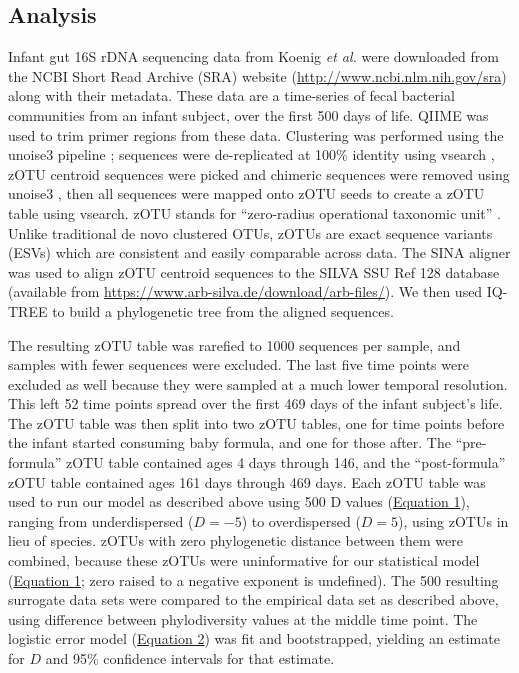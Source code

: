 \documentclass{article}
\begin{document}
\subsection{Analysis} \label{sec:analysis}
Infant gut 16S rDNA sequencing data from Koenig \emph{et al.} \cite{Koenig2011} were downloaded from the NCBI Short Read Archive (SRA) website (\url{http://www.ncbi.nlm.nih.gov/sra}) along with their metadata. These data are a time-series of fecal bacterial communities from an infant subject, over the first 500 days of life. QIIME \cite{Caporaso2010} was used to trim primer regions from these data. Clustering was performed using the unoise3 pipeline \cite{Edgar2016}; sequences were de-replicated at 100\% identity using vsearch \cite{Rognes2016}, zOTU centroid sequences were picked and chimeric sequences were removed using unoise3 \cite{Edgar2016}, then all sequences were mapped onto zOTU seeds to create a zOTU table using vsearch. zOTU stands for “zero-radius operational taxonomic unit” \cite{Edgar2016}. Unlike traditional de novo clustered OTUs, zOTUs are exact sequence variants (ESVs) which are consistent and easily comparable across data. The SINA aligner \cite{Pruesse2012} was used to align zOTU centroid sequences to the SILVA SSU Ref 128 database (available from \url{https://www.arb-silva.de/download/arb-files/}). We then used IQ-TREE \cite{Nguyen2015} to build a phylogenetic tree from the aligned sequences.
\par
The resulting zOTU table was rarefied to 1000 sequences per sample, and samples with fewer sequences were excluded. The last five time points were excluded as well because they were sampled at a much lower temporal resolution. This left 52 time points spread over the first 469 days of the infant subject's life. The zOTU table was then split into two zOTU tables, one for time points before the infant started consuming baby formula, and one for those after. The “pre-formula” zOTU table contained ages 4 days through 146, and the “post-formula” zOTU table contained ages 161 days through 469 days. Each zOTU table was used to run our model as described above using 500 D values (\hyperref[sec:equation1]{Equation 1}), ranging from underdispersed (\(D = -5\)) to overdispersed (\(D = 5\)), using zOTUs in lieu of species. zOTUs with zero phylogenetic distance between them were combined, because these zOTUs were uninformative for our statistical model (\hyperref[sec:equation1]{Equation 1}; zero raised to a negative exponent is undefined). The 500 resulting surrogate data sets were compared to the empirical data set as described above, using difference between phylodiversity values at the middle time point. The logistic error model (\hyperref[sec:equation2]{Equation 2}) was fit and bootstrapped, yielding an estimate for \(D\) and 95\% confidence intervals for that estimate.
\end{document}
